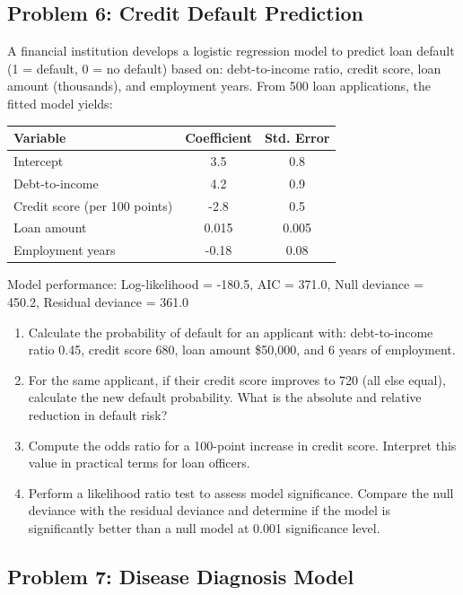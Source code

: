 \documentclass[12pt]{article}
\begin{document}
\subsection*{Problem 6: Credit Default Prediction}

A financial institution develops a logistic regression model to predict loan default (1 = default, 0 = no default) based on: debt-to-income ratio, credit score, loan amount (thousands), and employment years. From 500 loan applications, the fitted model yields:

\begin{center}
\begin{tabular}{lcc}
\toprule
Variable & Coefficient & Std. Error \\
\midrule
Intercept & 3.5 & 0.8 \\
Debt-to-income & 4.2 & 0.9 \\
Credit score (per 100 points) & -2.8 & 0.5 \\
Loan amount & 0.015 & 0.005 \\
Employment years & -0.18 & 0.08 \\
\bottomrule
\end{tabular}
\end{center}

Model performance: Log-likelihood = -180.5, AIC = 371.0, Null deviance = 450.2, Residual deviance = 361.0

\begin{enumerate}[label=(\alph*)]
\item Calculate the probability of default for an applicant with: debt-to-income ratio 0.45, credit score 680, loan amount \$50,000, and 6 years of employment.

\item For the same applicant, if their credit score improves to 720 (all else equal), calculate the new default probability. What is the absolute and relative reduction in default risk?

\item Compute the odds ratio for a 100-point increase in credit score. Interpret this value in practical terms for loan officers.

\item Perform a likelihood ratio test to assess model significance. Compare the null deviance with the residual deviance and determine if the model is significantly better than a null model at 0.001 significance level.
\end{enumerate}

\subsection*{Problem 7: Disease Diagnosis Model}
\end{document}
